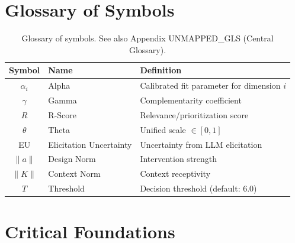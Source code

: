 \section{Glossary of Symbols}
\label{sec:iii-glossary}

\begin{table}[h]
\centering
\begin{tabular}{clp{8cm}}
\toprule
\textbf{Symbol} & \textbf{Name} & \textbf{Definition} \\
\midrule
$\alpha_i$ & Alpha & Calibrated fit parameter for dimension $i$ \\
$\gamma$ & Gamma & Complementarity coefficient \\
$R$ & R-Score & Relevance/prioritization score \\
$\theta$ & Theta & Unified scale $\in [0,1]$ \\
EU & Elicitation Uncertainty & Uncertainty from LLM elicitation \\
$\|a\|$ & Design Norm & Intervention strength \\
$\|K\|$ & Context Norm & Context receptivity \\
$T$ & Threshold & Decision threshold (default: 6.0) \\
\bottomrule
\end{tabular}
\caption{Glossary of symbols. See also Appendix UNMAPPED_GLS (Central Glossary).}
\end{table}


\section{Critical Foundations}
\label{sec:iii-foundations}

